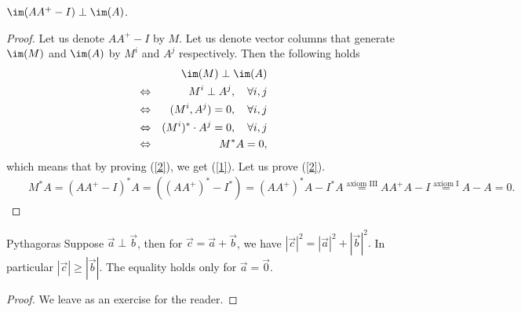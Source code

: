     \begin{lemma}{}{}
        $\im (AA^+-I) \perp \im (A) $.
    \end{lemma}
    \begin{proof}    
        Let us denote $ AA^+-I$ by $M$. Let us denote vector columns that generate $\im(M)$ and $\im(A)$ by $M^i$ and $A^j$ respectively. Then the following holds
        \begin{eqnarray}
            &&\im(M)  \perp \im (A) \label{1}\\
            \Leftrightarrow &&M^i \perp A^j,\quad \forall i,j\nonumber\\
            \Leftrightarrow &&(M^i, A^j)=0,\quad \forall i,j\nonumber\\
            \Leftrightarrow &&(M^i)^*\cdot A^j=0,\quad \forall i,j\nonumber\\
            \Leftrightarrow &&M^*A=0,\label{2}
        \end{eqnarray}
        which means that by proving (\ref{2}), we get (\ref{1}). Let us prove (\ref{2}).
        \begin{eqnarray}
            &&M^* A=(AA^+-I)^* A
            =((AA^+)^*-I^*) 
            =(AA^+)^*A-I^* A
            \stackrel{\text{axiom III}}{=}AA^+A-I
            \stackrel{\text{axiom I}}{=}A-A=0\nonumber.
        \end{eqnarray}
    \end{proof}
    \begin{theorema}{Pythagoras}{}
        Suppose $\vec{a} \perp \vec{b}$, then for $\vec{c} = \vec{a} + \vec{b}$, we have $|\vec{c}|^2 = |\vec{a}|^2 + |\vec{b}|^2.$ In particular $|\vec{c}| \geq |\vec{b}|$. The equality holds only for $\vec{a} = \vec{0}$.
    \end{theorema}      
    \begin{proof}
        We leave as an exercise for the reader.
    \end{proof}
